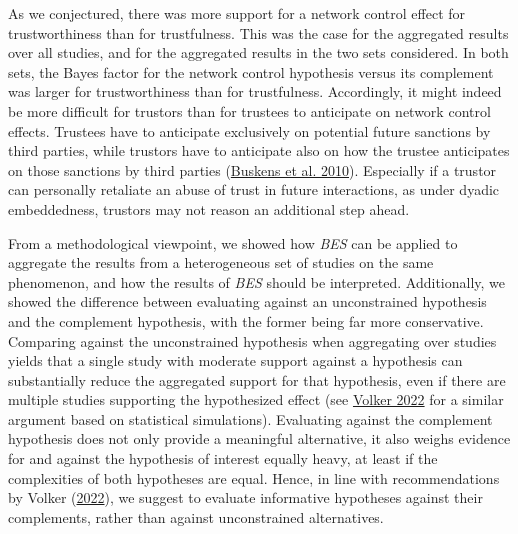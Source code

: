 \documentclass[
  11pt,
]{article}
\begin{document}
As we conjectured, there was more support for a network control effect for trustworthiness than for trustfulness.
This was the case for the aggregated results over all studies, and for the aggregated results in the two sets considered.
In both sets, the Bayes factor for the network control hypothesis versus its complement was larger for trustworthiness than for trustfulness.
Accordingly, it might indeed be more difficult for trustors than for trustees to anticipate on network control effects.
Trustees have to anticipate exclusively on potential future sanctions by third parties, while trustors have to anticipate also on how the trustee anticipates on those sanctions by third parties (\protect\hyperlink{ref-buskens_raub_veer_triads_2010}{Buskens et al. 2010}).
Especially if a trustor can personally retaliate an abuse of trust in future interactions, as under dyadic embeddedness, trustors may not reason an additional step ahead.

From a methodological viewpoint, we showed how \emph{BES} can be applied to aggregate the results from a heterogeneous set of studies on the same phenomenon, and how the results of \emph{BES} should be interpreted.
Additionally, we showed the difference between evaluating against an unconstrained hypothesis and the complement hypothesis, with the former being far more conservative.
Comparing against the unconstrained hypothesis when aggregating over studies yields that a single study with moderate support against a hypothesis can substantially reduce the aggregated support for that hypothesis, even if there are multiple studies supporting the hypothesized effect (see \protect\hyperlink{ref-volker_bes_2022}{Volker 2022} for a similar argument based on statistical simulations).
Evaluating against the complement hypothesis does not only provide a meaningful alternative, it also weighs evidence for and against the hypothesis of interest equally heavy, at least if the complexities of both hypotheses are equal.
Hence, in line with recommendations by Volker (\protect\hyperlink{ref-volker_bes_2022}{2022}), we suggest to evaluate informative hypotheses against their complements, rather than against unconstrained alternatives.
\end{document}
